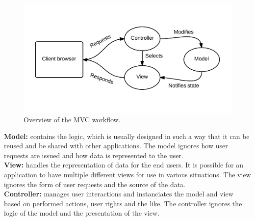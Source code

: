 \begin{figure}[h]
\includegraphics[width=\textwidth]{img/mvc.png}
\caption{Overview of the MVC workflow.}
\label{fig:mvc}
\end{figure}

\textbf{Model:} contains the logic, which is usually designed in such a way that it can be reused and be shared with other applications. The model ignores how user requests are issued and how data is represented to the user.\\

\textbf{View:} handles the representation of data for the end users. It is possible for an application to have multiple different views for use in various situations. The view ignores the form of user requests and the source of the data.\\

\textbf{Controller:} manages user interactions and instanciates the model and view based on performed actions, user rights and the like. The controller ignores the logic of the model and the presentation of the view.